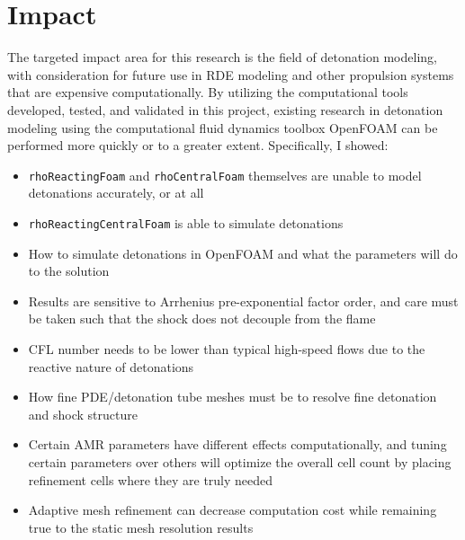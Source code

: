 \section{Impact}
The targeted impact area for this research is the field of detonation modeling, with consideration for future use in RDE modeling and other propulsion systems that are expensive computationally. By utilizing the computational tools developed, tested, and validated in this project, existing research in detonation modeling using the computational fluid dynamics toolbox OpenFOAM can be performed more quickly or to a greater extent. Specifically, I showed:
\begin{itemize}
\item \verb|rhoReactingFoam| and \verb|rhoCentralFoam| themselves are unable to model detonations accurately, or at all 
\item \verb|rhoReactingCentralFoam| is able to simulate detonations
\item How to simulate detonations in OpenFOAM and what the parameters will do to the solution
\item Results are sensitive to Arrhenius pre-exponential factor order, and care must be taken such that the shock does not decouple from the flame
\item CFL number needs to be lower than typical high-speed flows due to the reactive nature of detonations
\item How fine PDE/detonation tube meshes must be to resolve fine detonation and shock structure
\item Certain AMR parameters have different effects computationally, and tuning certain parameters over others will optimize the overall cell count by placing refinement cells where they are truly needed 
\item Adaptive mesh refinement can decrease computation cost while remaining true to the static mesh resolution results 
\end{itemize}


